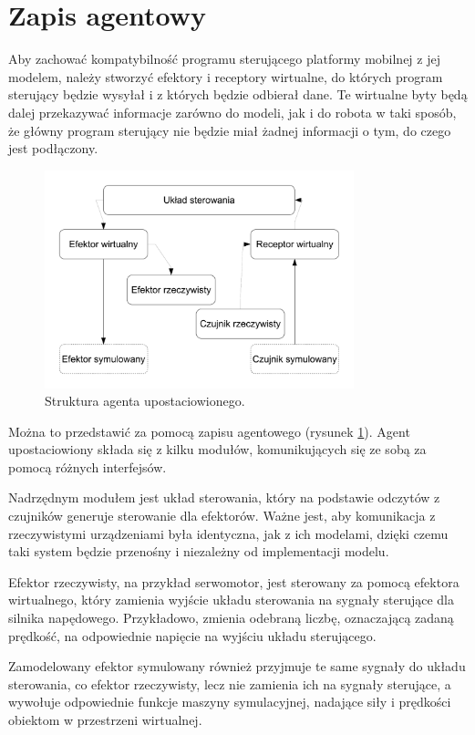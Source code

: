 \section{Zapis agentowy}
	Aby zachować kompatybilność programu sterującego platformy mobilnej z jej modelem, należy stworzyć efektory i receptory wirtualne, do których 
	program sterujący będzie wysyłał i z których będzie odbierał dane. 
	Te wirtualne byty będą dalej przekazywać informacje zarówno do modeli, jak i do robota w taki sposób, że
	główny program sterujący nie będzie miał żadnej informacji o tym, do czego jest podłączony. 
	
	\begin{figure}[h]
		\centering
		\includegraphics[width=0.8\textwidth]{graphics/agent.pdf}
		\caption{Struktura agenta upostaciowionego.}
		\label{fig:agent}
	\end{figure} 

	Można to przedstawić za pomocą zapisu agentowego (rysunek \ref{fig:agent}).
	Agent upostaciowiony składa się z kilku modułów, komunikujących się ze sobą za pomocą różnych interfejsów.

	Nadrzędnym modułem jest układ sterowania, który na podstawie odczytów z czujników generuje sterowanie dla efektorów.
	Ważne jest, aby komunikacja z rzeczywistymi urządzeniami była identyczna, jak z ich modelami, dzięki czemu taki system będzie przenośny i niezależny od implementacji modelu.

	Efektor rzeczywisty, na przykład serwomotor, jest sterowany za pomocą efektora wirtualnego, który zamienia wyjście układu sterowania na sygnały sterujące dla silnika napędowego.
	Przykładowo, zmienia odebraną liczbę, oznaczającą zadaną prędkość, na odpowiednie napięcie na wyjściu układu sterującego.

	Zamodelowany efektor symulowany również przyjmuje te same sygnały do układu sterowania, co efektor rzeczywisty, 
	lecz nie zamienia ich na sygnały sterujące, a wywołuje odpowiednie funkcje maszyny symulacyjnej, nadające siły i prędkości obiektom w przestrzeni wirtualnej.

